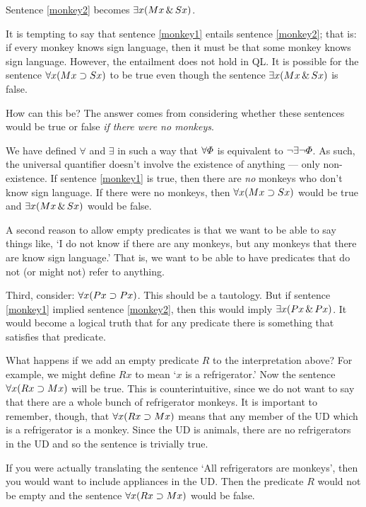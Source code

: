 Sentence \ref{monkey2} becomes $\exists x(Mx \,\&\, Sx)$.

It is tempting to say that sentence \ref{monkey1} entails sentence \ref{monkey2}; that is: if every monkey knows sign language, then it must be that some monkey knows sign language. However, the entailment does not hold in QL. It is possible for the sentence $\forall x(Mx \supset Sx)$ to be true even though the sentence $\exists x(Mx \,\&\, Sx)$ is false.

How can this be? The answer comes from considering whether these sentences would be true or false \emph{if there were no monkeys}.

We have defined $\forall$ and $\exists$ in such a way that $\forall\varPhi{}$ is equivalent to $\neg \exists\neg \varPhi{}$. As such, the universal quantifier doesn't involve the existence of anything --- only non-existence. If sentence \ref{monkey1} is true, then there are \emph{no} monkeys who don't know sign language. If there were no monkeys, then $\forall x(Mx \supset Sx)$ would be true and $\exists x(Mx \,\&\, Sx)$ would be false.

A second reason to allow empty predicates is that we want to be able to say things like, `I do not know if there are any monkeys, but any monkeys that there are know sign language.' That is, we want to be able to have predicates that do not (or might not) refer to anything.

Third, consider: $\forall x (Px \supset Px)$. This should be a tautology. But if sentence \ref{monkey1} implied sentence \ref{monkey2}, then this would imply $\exists x (Px \,\&\, Px)$. It would become a logical truth that for any predicate there is something that satisfies that predicate.

What happens if we add an empty predicate $R$ to the interpretation above? For example, we might define $Rx$ to mean `$x$ is a refrigerator.' Now the sentence $\forall x(Rx \supset Mx)$ will be true. This is counterintuitive, since we do not want to say that there are a whole bunch of refrigerator monkeys. It is important to remember, though, that $\forall x(Rx \supset Mx)$ means that any member of the UD which is a refrigerator is a monkey. Since the UD is animals, there are no refrigerators in the UD and so the sentence is trivially true.

If you were actually translating the sentence `All refrigerators are monkeys', then you would want to include appliances in the UD. Then the predicate $R$ would not be empty and the sentence $\forall x(Rx \supset Mx)$ would be false.

